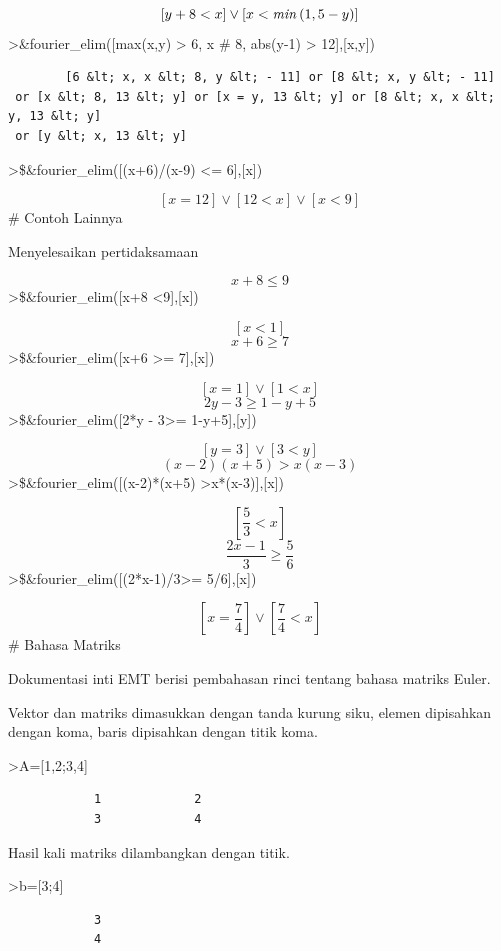 \documentclass[
]{book}
\begin{document}
\[\left[ y+8<x \right] \lor \left[ x<{\it min}\left(1 , 5-y\right)   \right] \]\textgreater\&fourier\_elim({[}max(x,y) \textgreater{} 6, x \# 8, abs(y-1) \textgreater{} 12{]},{[}x,y{]})

\begin{verbatim}
        [6 &lt; x, x &lt; 8, y &lt; - 11] or [8 &lt; x, y &lt; - 11]
 or [x &lt; 8, 13 &lt; y] or [x = y, 13 &lt; y] or [8 &lt; x, x &lt; y, 13 &lt; y]
 or [y &lt; x, 13 &lt; y]
\end{verbatim}

\textgreater\$\&fourier\_elim({[}(x+6)/(x-9) \textless= 6{]},{[}x{]})

\[\left[ x=12 \right] \lor \left[ 12<x \right] \lor \left[ x<9   \right] \]\# Contoh Lainnya

Menyelesaikan pertidaksamaan

\[x+8 \le 9\]\textgreater\$\&fourier\_elim({[}x+8 \textless9{]},{[}x{]})

\[\left[ x<1 \right] \]\[x+6 \ge 7\]\textgreater\$\&fourier\_elim({[}x+6 \textgreater= 7{]},{[}x{]})

\[\left[ x=1 \right] \lor \left[ 1<x \right] \]\[2y - 3 \ge 1-y+5\]\textgreater\$\&fourier\_elim({[}2*y - 3\textgreater= 1-y+5{]},{[}y{]})

\[\left[ y=3 \right] \lor \left[ 3<y \right] \]\[(x-2)(x+5) > x(x-3)\]\textgreater\$\&fourier\_elim({[}(x-2)*(x+5) \textgreater x*(x-3){]},{[}x{]})

\[\left[ \frac{5}{3}<x \right] \]\[\frac {2x-1}{3} \ge \frac{5}{6}\]\textgreater\$\&fourier\_elim({[}(2*x-1)/3\textgreater= 5/6{]},{[}x{]})

\[\left[ x=\frac{7}{4} \right] \lor \left[ \frac{7}{4}<x \right] \]\# Bahasa Matriks

Dokumentasi inti EMT berisi pembahasan rinci tentang bahasa matriks Euler.

Vektor dan matriks dimasukkan dengan tanda kurung siku, elemen dipisahkan dengan koma, baris dipisahkan dengan titik koma.

\textgreater A={[}1,2;3,4{]}

\begin{verbatim}
            1             2 
            3             4 
\end{verbatim}

Hasil kali matriks dilambangkan dengan titik.

\textgreater b={[}3;4{]}

\begin{verbatim}
            3 
            4 
\end{verbatim}
\end{document}
